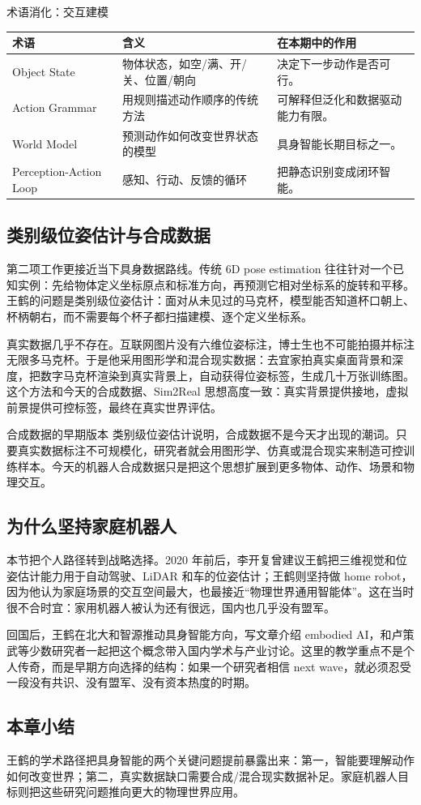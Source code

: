 \begin{knowledgebox}{术语消化：交互建模}
\begin{tabularx}{\textwidth}{p{}p{}X}
\toprule
术语 & 含义 & 在本期中的作用 \\
\midrule
Object State & 物体状态，如空/满、开/关、位置/朝向 & 决定下一步动作是否可行。 \\
Action Grammar & 用规则描述动作顺序的传统方法 & 可解释但泛化和数据驱动能力有限。 \\
World Model & 预测动作如何改变世界状态的模型 & 具身智能长期目标之一。 \\
Perception-Action Loop & 感知、行动、反馈的循环 & 把静态识别变成闭环智能。 \\
\bottomrule
\end{tabularx}
\end{knowledgebox}

\subsection{类别级位姿估计与合成数据}

第二项工作更接近当下具身数据路线。传统 6D pose estimation 往往针对一个已知实例：先给物体定义坐标原点和标准方向，再预测它相对坐标系的旋转和平移。王鹤的问题是类别级位姿估计：面对从未见过的马克杯，模型能否知道杯口朝上、杯柄朝右，而不需要每个杯子都扫描建模、逐个定义坐标系。

真实数据几乎不存在。互联网图片没有六维位姿标注，博士生也不可能拍摄并标注无限多马克杯。于是他采用图形学和混合现实数据：去宜家拍真实桌面背景和深度，把数字马克杯渲染到真实背景上，自动获得位姿标签，生成几十万张训练图。这个方法和今天的合成数据、Sim2Real 思想高度一致：真实背景提供接地，虚拟前景提供可控标签，最终在真实世界评估。

\begin{importantbox}{合成数据的早期版本}
类别级位姿估计说明，合成数据不是今天才出现的潮词。只要真实数据标注不可规模化，研究者就会用图形学、仿真或混合现实来制造可控训练样本。今天的机器人合成数据只是把这个思想扩展到更多物体、动作、场景和物理交互。
\end{importantbox}

\subsection{为什么坚持家庭机器人}

本节把个人路径转到战略选择。2020 年前后，李开复曾建议王鹤把三维视觉和位姿估计能力用于自动驾驶、LiDAR 和车的位姿估计；王鹤则坚持做 home robot，因为他认为家庭场景的交互空间最大，也最接近“物理世界通用智能体”。这在当时很不合时宜：家用机器人被认为还有很远，国内也几乎没有盟军。

回国后，王鹤在北大和智源推动具身智能方向，写文章介绍 embodied AI，和卢策武等少数研究者一起把这个概念带入国内学术与产业讨论。这里的教学重点不是个人传奇，而是早期方向选择的结构：如果一个研究者相信 next wave，就必须忍受一段没有共识、没有盟军、没有资本热度的时期。

\subsection{本章小结}

王鹤的学术路径把具身智能的两个关键问题提前暴露出来：第一，智能要理解动作如何改变世界；第二，真实数据缺口需要合成/混合现实数据补足。家庭机器人目标则把这些研究问题推向更大的物理世界应用。

